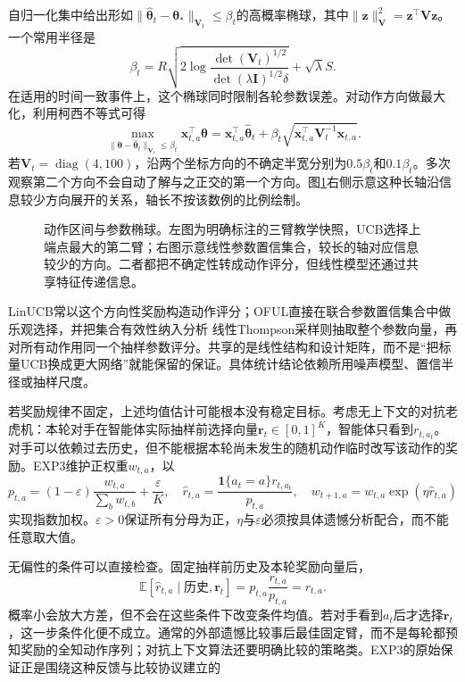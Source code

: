 自归一化集中给出形如$\lVert\widehat{\bm{\theta}}_t-\bm{\theta}_*\rVert_{\bm{V}_t}\leq\beta_t$的高概率椭球，其中$\lVert\bm{z}\rVert_{\bm{V}}^2=\bm{z}^{\top}\bm{V}\bm{z}$。一个常用半径是
\[
  \beta_t=R\sqrt{2\log
       \frac{\det(\bm{V}_t)^{1/2}}
            {\det(\lambda\bm{I})^{1/2}\delta}}
       +\sqrt{\lambda}S .
\]
在适用的时间一致事件上，这个椭球同时限制各轮参数误差。对动作方向做最大化，利用柯西不等式可得
\[
  \max_{\lVert\bm{\theta}-\widehat{\bm{\theta}}_t\rVert_{\bm{V}_t}\leq\beta_t}
  \bm{x}_{t,a}^{\top}\bm{\theta}
  =
  \bm{x}_{t,a}^{\top}\widehat{\bm{\theta}}_t
  +\beta_t\sqrt{\bm{x}_{t,a}^{\top}\bm{V}_t^{-1}\bm{x}_{t,a}}.
\]
若$\bm{V}_t=\operatorname{diag}(4,100)$，沿两个坐标方向的不确定半宽分别为$0.5\beta_t$和$0.1\beta_t$。多次观察第二个方向不会自动了解与之正交的第一个方向。图\ref{fig:rl-learning-bandit-geometry}右侧示意这种长轴沿信息较少方向展开的关系，轴长不按该数例的比例绘制。

\begin{figure}[t]
  \centering
  
  \caption{动作区间与参数椭球。左图为明确标注的三臂教学快照，UCB选择上端点最大的第二臂；右图示意线性参数置信集合，较长的轴对应信息较少的方向。二者都把不确定性转成动作评分，但线性模型还通过共享特征传递信息。}
  \label{fig:rl-learning-bandit-geometry}
\end{figure}

LinUCB常以这个方向性奖励构造动作评分；OFUL直接在联合参数置信集合中做乐观选择，并把集合有效性纳入分析
线性Thompson采样则抽取整个参数向量，再对所有动作用同一个抽样参数评分。共享的是线性结构和设计矩阵，而不是“把标量UCB换成更大网络”就能保留的保证。具体统计结论依赖所用噪声模型、置信半径或抽样尺度。

若奖励规律不固定，上述均值估计可能根本没有稳定目标。考虑无上下文的对抗老虎机：本轮对手在智能体实际抽样前选择向量$\bm{r}_t\in[0,1]^K$，智能体只看到$r_{t,a_t}$。对手可以依赖过去历史，但不能根据本轮尚未发生的随机动作临时改写该动作的奖励。EXP3维护正权重$w_{t,a}$，以
\begin{equation}
  p_{t,a}=(1-\varepsilon)\frac{w_{t,a}}{\sum_b w_{t,b}}
                 +\frac{\varepsilon}{K},\quad
  \widehat r_{t,a}=\frac{\mathbf 1\{a_t=a\}r_{t,a_t}}{p_{t,a}},
  \quad
  w_{t+1,a}=w_{t,a}\exp(\eta\widehat r_{t,a})
  \label{eq:rl-learning-exp3}
\end{equation}
实现指数加权。$\varepsilon>0$保证所有分母为正，$\eta$与$\varepsilon$必须按具体遗憾分析配合，而不能任意取大值。

无偏性的条件可以直接检查。固定抽样前历史及本轮奖励向量后，
\[
  \mathbb E[\widehat r_{t,a}\mid\text{历史},\bm{r}_t]
  =p_{t,a}\frac{r_{t,a}}{p_{t,a}}=r_{t,a}.
\]
概率小会放大方差，但不会在这些条件下改变条件均值。若对手看到$a_t$后才选择$\bm{r}_t$，这一步条件化便不成立。通常的外部遗憾比较事后最佳固定臂，而不是每轮都预知奖励的全知动作序列；对抗上下文算法还要明确比较的策略类。EXP3的原始保证正是围绕这种反馈与比较协议建立的

